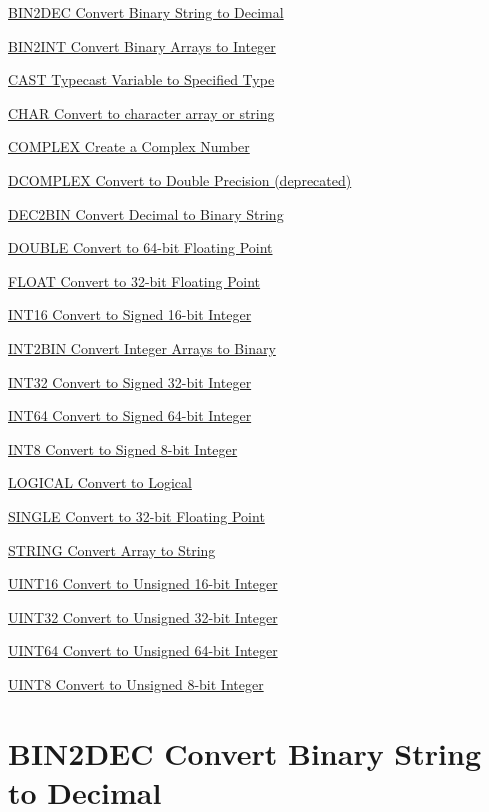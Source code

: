 
\begin{DoxyItemize}
\item \hyperlink{typecast_bin2dec}{B\-I\-N2\-D\-E\-C Convert Binary String to Decimal}  
\item \hyperlink{typecast_bin2int}{B\-I\-N2\-I\-N\-T Convert Binary Arrays to Integer}  
\item \hyperlink{typecast_cast}{C\-A\-S\-T Typecast Variable to Specified Type}  
\item \hyperlink{typecast_char}{C\-H\-A\-R Convert to character array or string}  
\item \hyperlink{typecast_complex}{C\-O\-M\-P\-L\-E\-X Create a Complex Number}  
\item \hyperlink{typecast_dcomplex}{D\-C\-O\-M\-P\-L\-E\-X Convert to Double Precision (deprecated)}  
\item \hyperlink{typecast_dec2bin}{D\-E\-C2\-B\-I\-N Convert Decimal to Binary String}  
\item \hyperlink{typecast_double}{D\-O\-U\-B\-L\-E Convert to 64-\/bit Floating Point}  
\item \hyperlink{typecast_float}{F\-L\-O\-A\-T Convert to 32-\/bit Floating Point}  
\item \hyperlink{typecast_int16}{I\-N\-T16 Convert to Signed 16-\/bit Integer}  
\item \hyperlink{typecast_int2bin}{I\-N\-T2\-B\-I\-N Convert Integer Arrays to Binary}  
\item \hyperlink{typecast_int32}{I\-N\-T32 Convert to Signed 32-\/bit Integer}  
\item \hyperlink{typecast_int64}{I\-N\-T64 Convert to Signed 64-\/bit Integer}  
\item \hyperlink{typecast_int8}{I\-N\-T8 Convert to Signed 8-\/bit Integer}  
\item \hyperlink{typecast_logical}{L\-O\-G\-I\-C\-A\-L Convert to Logical}  
\item \hyperlink{typecast_single}{S\-I\-N\-G\-L\-E Convert to 32-\/bit Floating Point}  
\item \hyperlink{typecast_string}{S\-T\-R\-I\-N\-G Convert Array to String}  
\item \hyperlink{typecast_uint16}{U\-I\-N\-T16 Convert to Unsigned 16-\/bit Integer}  
\item \hyperlink{typecast_uint32}{U\-I\-N\-T32 Convert to Unsigned 32-\/bit Integer}  
\item \hyperlink{typecast_uint64}{U\-I\-N\-T64 Convert to Unsigned 64-\/bit Integer}  
\item \hyperlink{typecast_uint8}{U\-I\-N\-T8 Convert to Unsigned 8-\/bit Integer}  
\end{DoxyItemize}\hypertarget{typecast_bin2dec}{}\section{B\-I\-N2\-D\-E\-C Convert Binary String to Decimal}\label{typecast_bin2dec}
